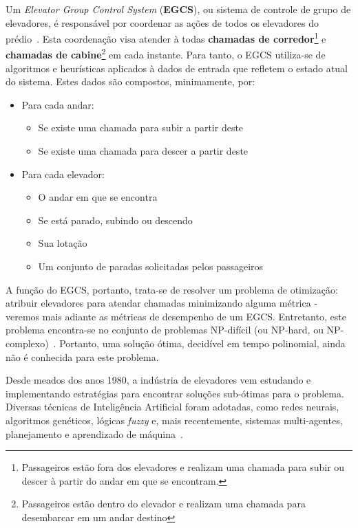 Um \textit{Elevator Group Control System} (\textbf{EGCS}), ou sistema de controle de grupo de elevadores, é responsável por coordenar as ações de todos os elevadores do prédio~\cite{kuzunuki1984elevator}. Esta coordenação visa atender à todas \textbf{chamadas de corredor}\footnote{Passageiros estão fora dos elevadores e realizam uma chamada para subir ou descer à partir do andar em que se encontram.} e \textbf{chamadas de cabine}\footnote{Passageiros estão dentro do elevador e realizam uma chamada para desembarcar em um andar destino} em cada instante. Para tanto, o EGCS utiliza-se de algoritmos e heurísticas aplicados à dados de entrada que refletem o estado atual do sistema. Estes dados são compostos, minimamente, por:

\begin{itemize}
  \item Para cada andar:
  \begin{itemize}
    \item Se existe uma chamada para subir a partir deste
    \item Se existe uma chamada para descer a partir deste
  \end{itemize}
  \item Para cada elevador:
  \begin{itemize}
    \item O andar em que se encontra
    \item Se está parado, subindo ou descendo
    \item Sua lotação
    \item Um conjunto de paradas solicitadas pelos passageiros
  \end{itemize}
\end{itemize}

A função do EGCS, portanto, trata-se de resolver um problema de otimização: atribuir elevadores para atendar chamadas minimizando alguma métrica - veremos mais adiante as métricas de desempenho de um EGCS. Entretanto, este problema encontra-se no conjunto de problemas NP-difícil (ou NP-hard, ou NP-complexo)~\cite{SeKo99}. Portanto, uma solução ótima, decidível em tempo polinomial, ainda não é conhecida para este problema.

Desde meados dos anos 1980, a indústria de elevadores vem estudando e implementando estratégias para encontrar soluções sub-ótimas para o problema. Diversas técnicas de Inteligência Artificial foram adotadas, como redes neurais, algoritmos genéticos, lógicas \textit{fuzzy} e, mais recentemente, sistemas multi-agentes, planejamento e aprendizado de máquina~\cite{KOEHLEROTTIGER02}.

